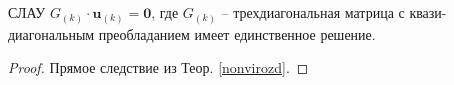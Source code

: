 \documentclass[__main__.tex]{subfiles}
\begin{document}
\begin{statement}
СЛАУ $G_{(k)}\cdot\symbf{u}_{(k)} = \symbf{0}$, где $G_{(k)}$ -- трехдиагональная матрица с квази-диагональным преобладанием имеет единственное решение.
\end{statement}
\begin{proof}
Прямое следствие из Теор. \ref{nonvirozd}.
\end{proof}
\end{document}

